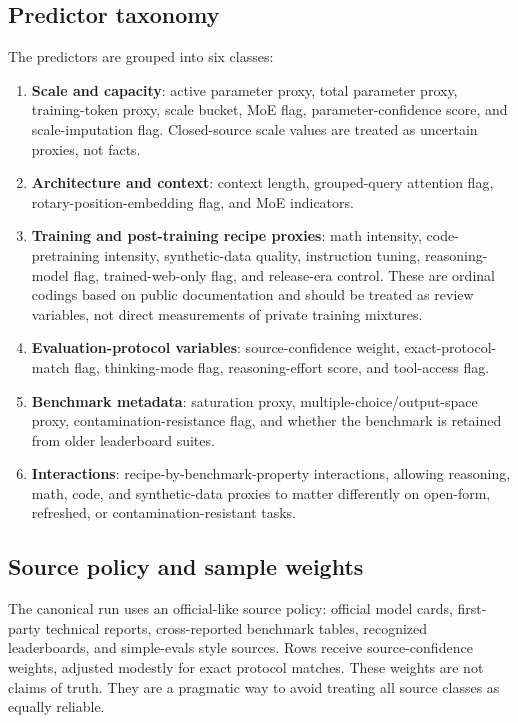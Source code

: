 \documentclass[11pt]{article}
\begin{document}
\subsection{Predictor taxonomy}
The predictors are grouped into six classes:
\begin{enumerate}[leftmargin=*]
\item \textbf{Scale and capacity}: active parameter proxy, total parameter proxy, training-token proxy, scale bucket, MoE flag, parameter-confidence score, and scale-imputation flag.  Closed-source scale values are treated as uncertain proxies, not facts.
\item \textbf{Architecture and context}: context length, grouped-query attention flag, rotary-position-embedding flag, and MoE indicators.
\item \textbf{Training and post-training recipe proxies}: math intensity, code-pretraining intensity, synthetic-data quality, instruction tuning, reasoning-model flag, trained-web-only flag, and release-era control.  These are ordinal codings based on public documentation and should be treated as review variables, not direct measurements of private training mixtures.
\item \textbf{Evaluation-protocol variables}: source-confidence weight, exact-protocol-match flag, thinking-mode flag, reasoning-effort score, and tool-access flag.
\item \textbf{Benchmark metadata}: saturation proxy, multiple-choice/output-space proxy, contamination-resistance flag, and whether the benchmark is retained from older leaderboard suites.
\item \textbf{Interactions}: recipe-by-benchmark-property interactions, allowing reasoning, math, code, and synthetic-data proxies to matter differently on open-form, refreshed, or contamination-resistant tasks.
\end{enumerate}

\subsection{Source policy and sample weights}
The canonical run uses an official-like source policy: official model cards, first-party technical reports, cross-reported benchmark tables, recognized leaderboards, and simple-evals style sources.  Rows receive source-confidence weights, adjusted modestly for exact protocol matches.  These weights are not claims of truth.  They are a pragmatic way to avoid treating all source classes as equally reliable.
\end{document}
